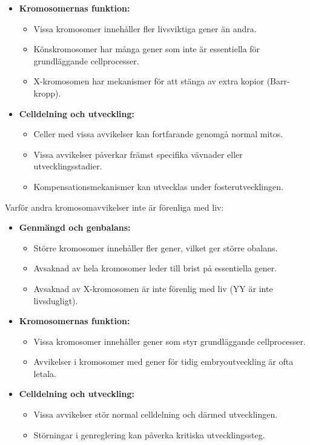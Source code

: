 \documentclass{exam}
\begin{document}
\begin{questions}
{\begin{itemize}
  \item \textbf{Kromosomernas funktion:}
    \begin{itemize}
      \item Vissa kromosomer innehåller fler livsviktiga gener än andra.
      \item Könskromosomer har många gener som inte är essentiella för grundläggande cellprocesser.
      \item X-kromosomen har mekanismer för att stänga av extra kopior (Barr-kropp).
    \end{itemize}
    
  \item \textbf{Celldelning och utveckling:}
    \begin{itemize}
      \item Celler med vissa avvikelser kan fortfarande genomgå normal mitos.
      \item Vissa avvikelser påverkar främst specifika vävnader eller utvecklingsstadier.
      \item Kompensationsmekanismer kan utvecklas under fosterutvecklingen.
    \end{itemize}
\end{itemize}

Varför andra kromosomavvikelser inte är förenliga med liv:
\begin{itemize}
  \item \textbf{Genmängd och genbalans:}
    \begin{itemize}
      \item Större kromosomer innehåller fler gener, vilket ger större obalans.
      \item Avsaknad av hela kromosomer leder till brist på essentiella gener.
      \item Avsaknad av X-kromosomen är inte förenlig med liv (YY är inte livsdugligt).
    \end{itemize}
    
  \item \textbf{Kromosomernas funktion:}
    \begin{itemize}
      \item Vissa kromosomer innehåller gener som styr grundläggande cellprocesser.
      \item Avvikelser i kromosomer med gener för tidig embryoutveckling är ofta letala.
    \end{itemize}
    
  \item \textbf{Celldelning och utveckling:}
    \begin{itemize}
      \item Vissa avvikelser stör normal celldelning och därmed utvecklingen.
      \item Störningar i genreglering kan påverka kritiska utvecklingssteg.
    \end{itemize}
\end{itemize}
}


\end{questions}
\end{document}
